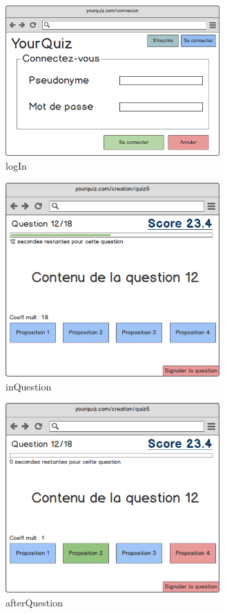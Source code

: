 \documentclass[a4paper, 12pt]{article}
\begin{document}
\begin{figure}
	\begin{center}
		\includegraphics[width=0.73\textwidth]{mockups/png/logIn.png}
        \caption{logIn}
	\end{center}
\end{figure}
\begin{figure}
	\begin{center}
		\includegraphics[width=0.73\textwidth]{mockups/png/inQuestion.png}
        \caption{inQuestion}
	\end{center}
\end{figure}
\begin{figure}
	\begin{center}
		\includegraphics[width=0.73\textwidth]{mockups/png/afterQuestion.png}
        \caption{afterQuestion}
	\end{center}
\end{figure}
\end{document}
